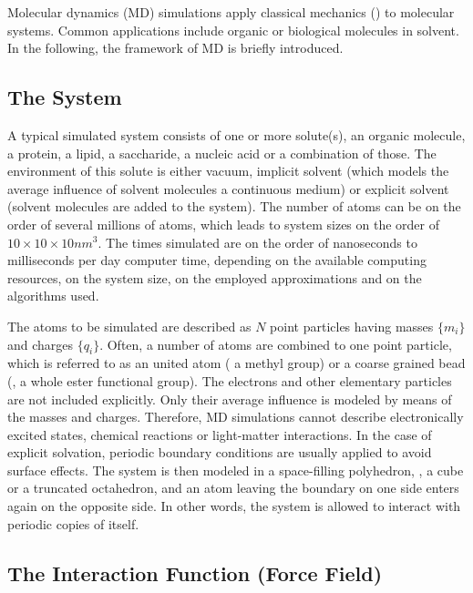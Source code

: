 Molecular dynamics (MD) simulations apply classical mechanics ()
to molecular systems. Common applications include organic or biological molecules in solvent.
In the following, the framework of MD is briefly introduced.

\subsection{The System}

A typical simulated system consists of one or more solute(s), 
\eg{} an organic molecule, a protein, a lipid, a saccharide,
a nucleic acid or a combination of those.
The environment of this
solute is either vacuum, implicit solvent (which models the average
influence of solvent molecules \via{} a continuous medium)
or explicit solvent (solvent molecules are  added to the system).
The number of atoms can be on the order of several 
millions of
atoms, which leads to system sizes on the order of $10\times10\times10\unit{nm}^3$. The
times simulated are on the order of nanoseconds to
milliseconds per day computer time, depending on the
available computing resources, on the system size,
on the employed approximations and on the algorithms used.

The 
atoms to be simulated are described as
$N$ point particles having masses $\{m_i\}$ and charges $\{q_i\}$. Often,
a number of atoms are combined to one point particle, which is
referred to as an united atom\cite{DA98.3} (\eg{} a methyl group) or a
coarse grained bead\cite{MA07.4,VO08.1} (\eg{}, a whole ester functional group).
The electrons and other elementary particles are not included explicitly.
Only their average influence is modeled by means
of the masses and charges. Therefore, MD simulations cannot describe
electronically excited states, 
chemical reactions or
light-matter interactions.
%
In the case of explicit solvation, periodic boundary conditions are
usually applied to avoid surface effects. The system is then modeled in a space-filling
polyhedron, \eg{}, a cube or a truncated octahedron, and an atom leaving the boundary
on one side enters again on the opposite side. 
In other words, 
the system is allowed to interact
with periodic copies of itself.


\subsection{The Interaction Function (Force Field)}
\label{sec:force_field}

